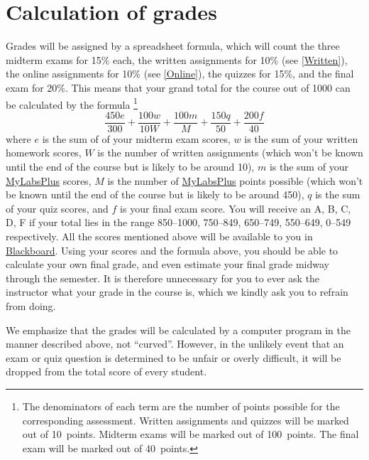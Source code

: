 \documentclass[11pt]{article}
\begin{document}
\section{Calculation of grades}\label{Assessment}
Grades will be assigned by a spreadsheet formula, which will count
the three midterm exams for 15\% each,
the written assignments for 10\% (see \autoref{Written}),
the online assignments for 10\% (see \autoref{Online}),
the quizzes for 15\%, and the final exam for 20\%.
This means that your grand total for the course out of 1000
can be calculated by the formula
\footnote{The denominators of each term are the number of points possible
for the corresponding assessment. Written assignments and quizzes will be marked
out of 10~points. Midterm exams will be marked out of 100~points. The final exam
will be marked out of 40~points.}
\[\frac{450e}{300}+\frac{100w}{10W}
+\frac{100m}{M}+\frac{150q}{50}+\frac{200f}{40}\]
where $e$ is the sum of of your midterm exam scores,
$w$ is the sum of your written homework scores, $W$ is the
number of written assignments (which won't be known until
the end of the course but is likely to be around 10),
$m$ is the sum of your
\href{http://iastate.mylabsplus.com}{MyLabsPlus} scores,
$M$ is the number of 
\href{http://iastate.mylabsplus.com}{MyLabsPlus} points possible
(which won't be known until the end of the course but is likely
to be around 450), $q$ is the sum
of your quiz scores, and $f$ is your final exam score.
You will receive an A, B, C, D, F if your total lies in the range
850--1000, 750--849, 650--749, 550--649, 0--549 respectively.
All the scores mentioned above will be available to you in
\href{https://bb.its.iastate.edu}{Blackboard}. Using your scores
and the formula above, you should be able to calculate your own final grade,
and even estimate your final grade midway through the semester.
It is therefore unnecessary for you to ever ask the instructor
what your grade in the course is, which we kindly ask you to refrain from
doing.

We emphasize that the grades will be calculated by a computer program
in the manner described
above, not ``curved''. However, in the unlikely event that an exam
or quiz question is determined
to be unfair or overly difficult, it will be dropped from the total score of
every student.
\end{document}
